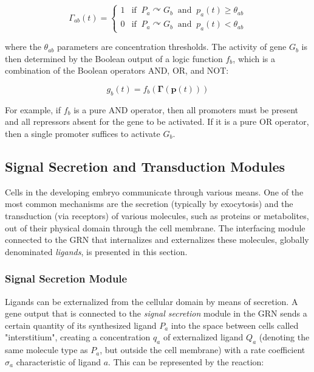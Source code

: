 $$\Gamma_{ab}(t) =   \begin{cases}     1 & \text{if}\;\; P_a \curvearrowright G_b \;\;\text{and}\;\; p_a(t) \geq \theta_{ab} \\[.5em]     0 & \text{if}\;\; P_a \curvearrowright G_b \;\;\text{and}\;\; p_a(t) \lt \theta_{ab}   \end{cases}$$

where the $\theta_{ab}$ parameters are concentration thresholds. The activity of gene $G_b$ is then determined by the Boolean output of a logic function $f_b$, which is a combination of the Boolean operators AND, OR, and NOT:

$$g_b(t) = f_b\left(\mathbf{\Gamma}(\mathbf{p}(t))\right)$$

For example, if $f_b$ is a pure AND operator, then all promoters must be present and all repressors absent for the gene to be activated. If it is a pure OR operator, then a single promoter suffices to activate $G_b$.


\subsection{Signal Secretion and Transduction Modules}


Cells in the developing embryo communicate through various means. One of the most common mechanisms are the secretion (typically by exocytosis) and the transduction (via receptors) of various molecules, such as proteins or metabolites, out of their physical domain through the cell membrane. The interfacing module connected to the GRN that internalizes and externalizes these molecules, globally denominated \textit{ligands}, is presented in this section.


\subsubsection{Signal Secretion Module}


Ligands can be externalized from the cellular domain by means of secretion. A gene output that is connected to the \textit{signal secretion} module in the GRN sends a certain quantity of its synthesized ligand $P_a$ into the space between cells called "interstitium", creating a concentration $q_a$ of externalized ligand $Q_a$ (denoting the same molecule type as $P_a$, but outside the cell membrane) with a rate coefficient $\sigma_a$ characteristic of ligand $a$. This can be represented by the reaction:


